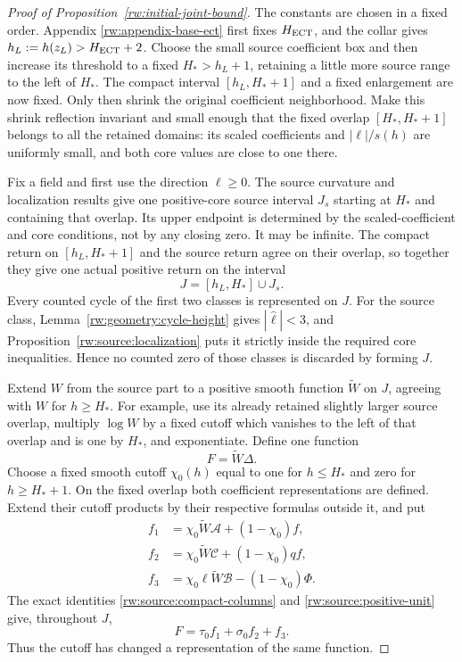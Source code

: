 \begin{proof}[Proof of Proposition~\ref{rw:initial-joint-bound}]
The constants are chosen in a fixed order. Appendix
\ref{rw:appendix-base-ect} first fixes $H_{\rm ECT}$, and the
collar gives $h_L:=h(z_L)>H_{\rm ECT}+2$. Choose the small source
coefficient box and then increase its threshold to a fixed
$H_*>h_L+1$, retaining a little more source range to the left of
$H_*$. The compact interval $[h_L,H_*+1]$ and a fixed enlargement
are now fixed. Only then shrink the original coefficient neighborhood.
Make this shrink reflection invariant and small enough that the fixed
overlap $[H_*,H_*+1]$ belongs to all the retained domains: its scaled
coefficients and $|\ell|/s(h)$ are uniformly small, and both core
values are close to one there.

Fix a field and first use the direction $\ell\ge0$.
The source curvature and localization results give one positive-core
source interval $J_s$ starting at $H_*$ and containing that overlap.
Its upper endpoint is determined by the scaled-coefficient and core
conditions, not by any closing zero. It may be infinite. The compact
return on $[h_L,H_*+1]$ and the source return agree on their overlap,
so together they give one actual positive return on the interval
\[
 J=[h_L,H_*]\cup J_s.
\]
Every counted cycle of the first two classes is represented on $J$.
For the source class, Lemma~\ref{rw:geometry:cycle-height} gives
$|\widehat\ell|<3$, and Proposition~\ref{rw:source:localization}
puts it strictly inside the required core inequalities. Hence no
counted zero of those classes is discarded by forming $J$.

Extend $W$ from the source part to a positive smooth function
$\widetilde W$ on $J$, agreeing with $W$ for $h\ge H_*$.
For example, use its already retained slightly larger source overlap,
multiply $\log W$ by a fixed cutoff which vanishes to the left of
that overlap and is one by $H_*$, and exponentiate. Define one
function
\[
 F=\widetilde W\Delta.
\]
Choose a fixed smooth cutoff $\chi_0(h)$ equal to one for
$h\le H_*$ and zero for $h\ge H_*+1$. On the fixed overlap both
coefficient representations are defined. Extend their cutoff products
by their respective formulas outside it, and put
\begin{equation}\label{rw:source:glued-columns}
\begin{aligned}
 f_1&=\chi_0\widetilde W\mathcal A+(1-\chi_0)f,\\
 f_2&=\chi_0\widetilde W\mathcal C+(1-\chi_0)qf,\\
 f_3&=\chi_0\ell\widetilde W\mathcal B-(1-\chi_0)\Phi.
\end{aligned}
\end{equation}
The exact identities \eqref{rw:source:compact-columns} and
\eqref{rw:source:positive-unit} give, throughout $J$,
\begin{equation}\label{rw:source:single-F}
 F=\tau_0 f_1+\sigma_0 f_2+f_3.
\end{equation}
Thus the cutoff has changed a representation of the same function.


\end{proof}
